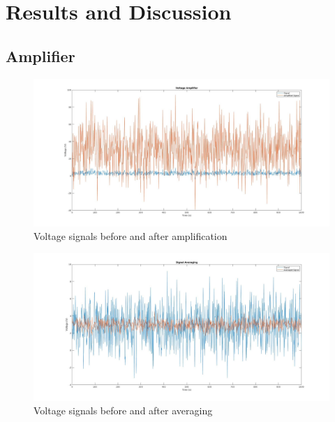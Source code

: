 \documentclass[a4paper, 12pt]{article}
\begin{document}
        
    \section{Results and Discussion}
        \subsection{Amplifier}
            \begin{figure}[!t]
                \centering
                \includegraphics[width=\textwidth]{amplifier.jpg}
                \caption{Voltage signals before and after amplification}
                \label{fig:amp}
            \end{figure}

            \begin{figure}[!t]
                \centering
                \includegraphics[width=\textwidth]{averaging.jpg}
                \caption{Voltage signals before and after averaging}
                \label{fig:ave}
            \end{figure}
\end{document}
